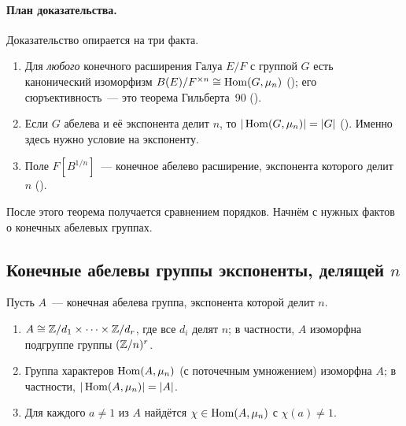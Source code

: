 \paragraph{План доказательства.} Доказательство опирается на три факта.
\begin{enumerate}[label=(\arabic*),leftmargin=*]
\item Для \emph{любого} конечного расширения Галуа $E/F$ с группой $G$ есть канонический изоморфизм
$B(E)/F^{\times n}\cong\operatorname{Hom}(G,\mu_n)$ (); его сюръективность~--- это теорема Гильберта~90 ().
\item Если $G$ абелева и её экспонента делит $n$, то $|\operatorname{Hom}(G,\mu_n)|=|G|$ (). Именно здесь нужно условие на
экспоненту.
\item Поле $F[B^{1/n}]$~--- конечное абелево расширение, экспонента которого делит $n$ ().
\end{enumerate}
После этого теорема получается сравнением порядков. Начнём с нужных фактов о конечных абелевых группах.

\subsection*{Конечные абелевы группы экспоненты, делящей $n$}

\begin{lemma}[5.30a]
Пусть $A$~--- конечная абелева группа, экспонента которой делит $n$.
\begin{enumerate}[label=\textup{(\alph*)}]
\item $A\cong\mathbb Z/d_1\times\dots\times\mathbb Z/d_r$, где все $d_i$ делят $n$; в частности, $A$ изоморфна подгруппе группы
$(\mathbb Z/n)^r$.
\item Группа характеров $\operatorname{Hom}(A,\mu_n)$ \textup(с поточечным умножением\textup) изоморфна $A$; в частности,
$|\operatorname{Hom}(A,\mu_n)|=|A|$.
\item Для каждого $a\ne1$ из $A$ найдётся $\chi\in\operatorname{Hom}(A,\mu_n)$ с $\chi(a)\ne1$.
\end{enumerate}
\end{lemma}

